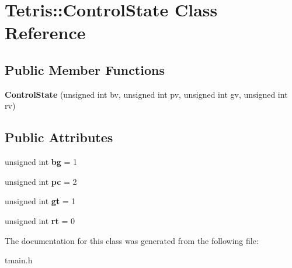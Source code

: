 \hypertarget{class_tetris_1_1_control_state}{\section{Tetris\-:\-:Control\-State Class Reference}
\label{class_tetris_1_1_control_state}
}
\subsection*{Public Member Functions}
\begin{DoxyCompactItemize}
\item 
\hypertarget{class_tetris_1_1_control_state_aa5acf647f5feac932c4b96a9691d366e}{{\bfseries Control\-State} (unsigned int bv, unsigned int pv, unsigned int gv, unsigned int rv)}\label{class_tetris_1_1_control_state_aa5acf647f5feac932c4b96a9691d366e}

\end{DoxyCompactItemize}
\subsection*{Public Attributes}
\begin{DoxyCompactItemize}
\item 
\hypertarget{class_tetris_1_1_control_state_a812b12ec2dbde3252cd46fee68852144}{unsigned int {\bfseries bg} = 1}\label{class_tetris_1_1_control_state_a812b12ec2dbde3252cd46fee68852144}

\item 
\hypertarget{class_tetris_1_1_control_state_aa2755dfd1afa1fbee79302a15aed385a}{unsigned int {\bfseries pc} = 2}\label{class_tetris_1_1_control_state_aa2755dfd1afa1fbee79302a15aed385a}

\item 
\hypertarget{class_tetris_1_1_control_state_a1fb910204a348fd2d4544a383e4049c2}{unsigned int {\bfseries gt} = 1}\label{class_tetris_1_1_control_state_a1fb910204a348fd2d4544a383e4049c2}

\item 
\hypertarget{class_tetris_1_1_control_state_abfe612ad0b21e6f4a429987272c36785}{unsigned int {\bfseries rt} = 0}\label{class_tetris_1_1_control_state_abfe612ad0b21e6f4a429987272c36785}

\end{DoxyCompactItemize}


The documentation for this class was generated from the following file\-:\begin{DoxyCompactItemize}
\item 
tmain.\-h\end{DoxyCompactItemize}
